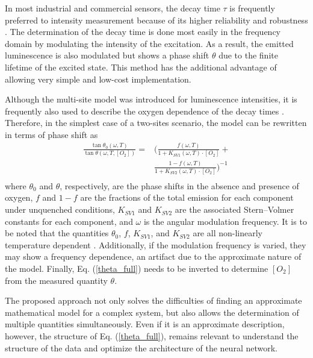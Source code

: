 \documentclass[sensors,article,submit,moreauthors,pdftex,10pt,a4paper]{Definitions/mdpi}
\begin{document}
In most industrial and commercial sensors, the decay time $\tau$ is frequently preferred to intensity measurement because of its higher reliability and robustness \cite{Wei2019}. The determination of the decay time is done most easily in the frequency domain by modulating the intensity of the excitation.  As a result, the emitted luminescence is also modulated but shows a phase shift $\theta$ due to the finite lifetime of the excited state. This method has the additional advantage of allowing very simple and low-cost implementation.

Although the multi-site model was introduced for luminescence intensities, it is frequently also used to describe the oxygen dependence of the decay times \cite{Demas1995,Quaranta2012}. Therefore, in the simplest case of a two-sites scenario, the model can be rewritten in terms of phase shift as \cite{Michelucci2019}
\begin{equation}
\begin{aligned}
\frac{\tan \theta_0 (\omega, T)}{\tan \theta (\omega, T, [O_2])}=
 & \bigg( \frac{f (\omega , T) }{1+K_{SV1} (\omega , T) \cdot \left[O_2\right]}+ \\
&\frac{1-f (\omega , T) }{1+K_{SV2} (\omega , T) \cdot \left[O_2\right]} \bigg)^{-1} \\
\label{theta_full}
\end{aligned}
\end{equation}
where $\theta_0$ and $\theta$, respectively, are the phase shifts in the absence and presence of oxygen, $f$ and $1-f$ are the fractions of the total emission for each component under unquenched conditions, $K_{SV1}$ and $K_{SV2}$ are the associated Stern–Volmer constants for each component, and $\omega$ is the angular modulation frequency. It is to be noted that the quantities $\theta_0$, $f$, $K_{SV1}$, and $K_{SV2}$ are all non-linearly temperature dependent \cite{Ogurtsov2006,lo2008,Zaitsev2016}. Additionally, if the modulation frequency is varied, they may show a frequency dependence, an artifact due to the approximate nature of the model. Finally, Eq. (\ref{theta_full}) needs to be inverted to determine $[O_2]$ from the measured quantity $\theta$.

The proposed approach not only solves the difficulties of finding an approximate mathematical model for a complex system, but also allows the determination of multiple quantities simultaneously. Even if it is an approximate description, however, the structure of Eq. (\ref{theta_full}), remains relevant to understand the structure of the data and optimize the architecture of the neural network.
\end{document}
